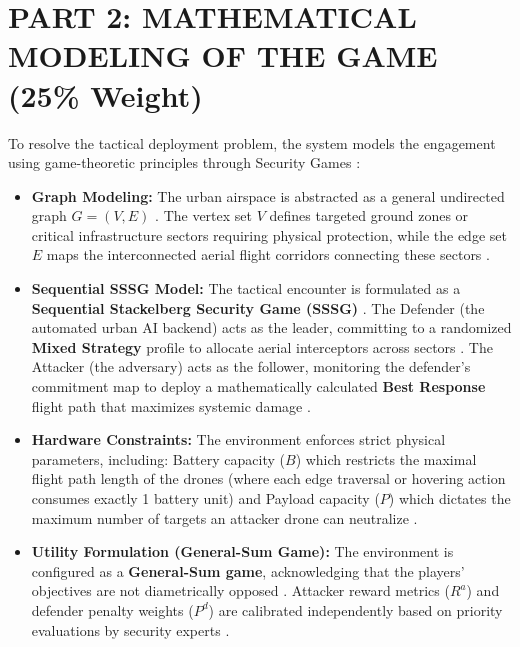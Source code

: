 \documentclass[../main.tex]{subfiles}
\begin{document}

\section{PART 2: MATHEMATICAL MODELING OF THE GAME (25\% Weight)}

To resolve the tactical deployment problem, the system models the engagement using game-theoretic principles through Security Games \cite{mutzari2025defending}:
\begin{itemize}
    \item \textbf{Graph Modeling:} The urban airspace is abstracted as a general undirected graph $G=(V,E)$ \cite{mutzari2025defending}. The vertex set $V$ defines targeted ground zones or critical infrastructure sectors requiring physical protection, while the edge set $E$ maps the interconnected aerial flight corridors connecting these sectors \cite{mutzari2025defending}.
    \item \textbf{Sequential SSSG Model:} The tactical encounter is formulated as a \textbf{Sequential Stackelberg Security Game (SSSG)} \cite{mutzari2025defending}. The Defender (the automated urban AI backend) acts as the leader, committing to a randomized \textbf{Mixed Strategy} profile to allocate aerial interceptors across sectors \cite{mutzari2025defending}. The Attacker (the adversary) acts as the follower, monitoring the defender's commitment map to deploy a mathematically calculated \textbf{Best Response} flight path that maximizes systemic damage \cite{mutzari2025defending}.
    \item \textbf{Hardware Constraints:} The environment enforces strict physical parameters, including: Battery capacity ($B$) which restricts the maximal flight path length of the drones (where each edge traversal or hovering action consumes exactly 1 battery unit) and Payload capacity ($P$) which dictates the maximum number of targets an attacker drone can neutralize \cite{mutzari2025defending}.
    \item \textbf{Utility Formulation (General-Sum Game):} The environment is configured as a \textbf{General-Sum game}, acknowledging that the players' objectives are not diametrically opposed \cite{mutzari2025defending}. Attacker reward metrics ($R^a$) and defender penalty weights ($P^d$) are calibrated independently based on priority evaluations by security experts \cite{mutzari2025defending}.
\end{itemize}
\end{document}
